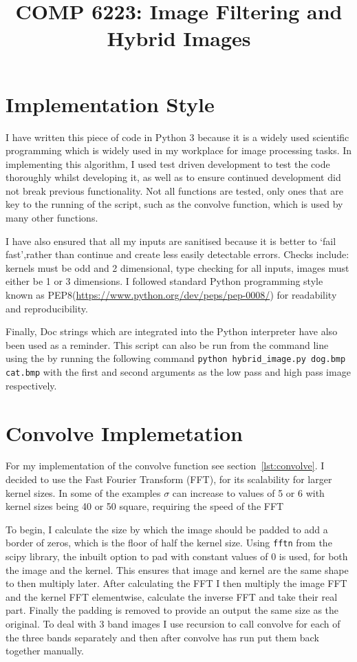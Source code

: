 \documentclass[a4paper,10pt]{article}
\title{COMP 6223: Image Filtering and Hybrid Images}
\date{}
\author{}
\begin{document}
\maketitle
\thispagestyle{fancy}

\section{Implementation Style}
I have written this piece of code in Python 3 because it is a widely used
scientific programming which is widely used in my workplace for image processing
tasks. In implementing this algorithm, I used test driven development to test the code
thoroughly whilst developing it, as well as to ensure continued development did
not break previous functionality. Not all functions are tested, only ones that
are key to the running of the script, such as the convolve function, which is
used by many other functions.

I have also ensured that all my inputs are sanitised because it is better to
`fail fast',rather than continue and create less easily detectable errors.
Checks include: kernels must be odd and 2 dimensional, type checking for all
inputs, images must either be 1 or 3 dimensions. I followed standard Python
programming style known as PEP8(\url{https://www.python.org/dev/peps/pep-0008/})
for readability and reproducibility.

Finally, Doc strings which are
integrated into the Python interpreter have also been used as a reminder. This
script can also be run from the command line using the by running the following
command \lstinline|python hybrid_image.py dog.bmp cat.bmp| with the
first and second arguments as the low pass  and high pass image respectively.

\section{Convolve Implemetation}
For my implementation of the convolve function see section~\ref{lst:convolve}. I
decided to use the Fast Fourier Transform (FFT), for its scalability
for larger kernel sizes. In some of the examples $\sigma$ can increase to values
of 5 or 6 with kernel sizes being 40 or 50 square, requiring the speed of the
FFT

To begin, I calculate the size by which the image should be padded to add a
border of zeros, which is the floor of half the kernel size. Using
\lstinline|fftn| from the scipy library, the inbuilt option to pad with constant
values of 0 is used, for both the image and the kernel. This ensures that
image and kernel are the same shape to then multiply later. After
calculating the FFT I then multiply the image FFT and the kernel FFT
elementwise, calculate the inverse FFT and take their real part. Finally the
padding is removed to provide an output the same size as the original. To deal with 3 band
images I use recursion to call convolve for each of the three bands separately
and then after convolve has run put them back together manually.
\end{document}
